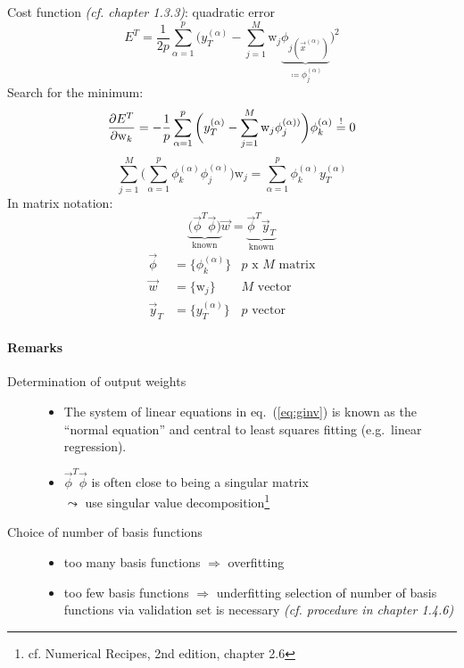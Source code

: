 \begin{enumerate}[(1)]
Cost function {\it(cf. chapter 1.3.3)}: quadratic error
\begin{equation}
	E^T = \frac{1}{2p} \sum_{\alpha = 1}^p \bigg( y_T^{(\alpha)} 
		- \sum_{j = 1}^M \mathrm{w}_j 
		\underbrace{ \phi_{j(\vec{x}^{(\alpha)})} }_{
			\coloneqq \phi_j^{(\alpha)} }
		\bigg)^2
\end{equation}
Search for the minimum:
\begin{equation}
	\frac{\partial E^T}{\partial \mathrm{w}_k} = -\frac{1}{p}
		\sum_{\alpha = 1}^p \bigg( y_T^{(\alpha)} - \sum_{j = 1}^M 
			\mathrm{w}_j \phi_j^{(\alpha))} 
		\bigg) \phi_k^{(\alpha)}
		\stackrel{\mathrm{!}}{=} 0
\end{equation}
\begin{equation}
	\sum_{j = 1}^M \bigg(\sum_{\alpha = 1}^p \phi_k^{(\alpha)}
		\phi_j^{(\alpha)} \bigg) \mathrm{w}_j 
		= \sum_{\alpha = 1}^p \phi_k^{(\alpha)} y_T^{(\alpha)}
\end{equation}
In matrix notation:
\begin{equation}\label{eq:ginv}
	\underbrace{\big( \vec{\phi}^T \vec{\phi} \big)}_{\text{known}} \vec{w}
		= \underbrace{\vec{\phi}^T \vec{y}_T}_{\text{known}}
\end{equation}
\[ \begin{array}{lll}
	\vec{\phi} & = \big\{ \phi_k^{(\alpha)} \big\}
		& p \text{ x } M \text{ matrix} \\
	\vec{w} & = \big\{ \mathrm{w}_j \big\} & M \text{ vector} \\
	\vec{y}_T & = \big\{ y_T^{(\alpha)} \big\} & p \text{ vector}
\end{array} \]
\end{enumerate}

\paragraph{Remarks}
\begin{description}
\item[Determination of output weights]\mbox{}
\begin{itemize}
\item The system of linear equations in eq.~(\ref{eq:ginv}) is known as the ``normal equation'' and central to least squares fitting (e.g.\ linear regression).
\item $\vec{\phi}^T \vec{\phi}$ is often close to being a singular
  matrix\\
  $\leadsto$ use singular value decomposition\footnote{cf. Numerical
    Recipes, 2nd edition, chapter 2.6}
\end{itemize}
\item[Choice of number of basis functions]\mbox{}
\begin{itemize}
	\item too many basis functions $\Rightarrow$ overfitting 
	\item too few basis functions $\Rightarrow$ underfitting
	\itR selection of number of basis functions via validation set is 
		necessary {\it (cf. procedure in chapter 1.4.6)}
\end{itemize}
\end{description}

